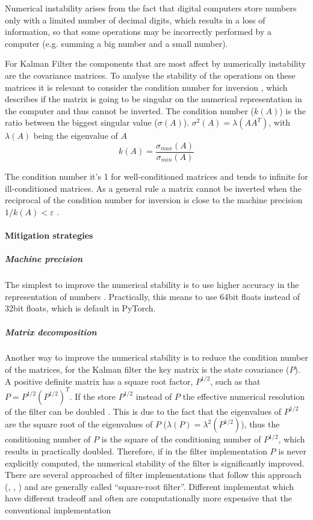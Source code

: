 \documentclass{article}
\begin{document}
Numerical instability arises from the fact that digital computers store numbers only with a limited number of decimal digits, which results in a loss of information, so that some operations may be incorrectly performed by a  computer (e.g. summing a big number and a small number).

For Kalman Filter the components that are most affect by numerically instability are the covariance matrices. To analyse the stability of the operations on these matrices it is relevant to consider the condition number for inversion \cite{mohinder_s_grewal_kalman_2001, kaminski_discrete_1971}, which describes if the matrix is going to be singular on the numerical representation in the computer and thus cannot be inverted. The condition number ($k(A)$) is the ratio between the biggest singular value ($\sigma(A)$). $\sigma^2(A) = \lambda(AA^T)$, with  $\lambda(A)$ being the eigenvalue of $A$
\begin{equation}\label{condition_number}
    k(A) = \frac{\sigma_{max}(A)}{\sigma_{min}(A)}
\end{equation}

The condition number it's 1 for well-conditioned matrices and tends to infinite for ill-conditioned matrices. As a general rule  a matrix cannot be inverted when the reciprocal of the condition number for inversion is close to the machine precision $ 1/k(A) < \varepsilon$ \cite{mohinder_s_grewal_kalman_2001}.

\paragraph{Mitigation strategies}

\subparagraph{Machine precision} The simplest to improve the numerical stability is to use higher accuracy in the representation of numbers \cite{dan_simon_optimal_2006}. Practically, this means to use 64bit floats instead of 32bit floats, which is default in PyTorch.

\subparagraph{Matrix decomposition} Another way to improve the numerical stability is to reduce the condition number of the matrices, for the Kalman filter the key matrix is the state covariance ($P$). A positive definite matrix has a square root factor, $P^{1/2}$, such as that $P = P^{1/2}(P^{1/2})^T$. If the store $P^{1/2}$ instead of $P$ the effective numerical resolution of the filter can be doubled \cite{kaminski_discrete_1971} \cite{dan_simon_optimal_2006} \cite{rutten_square-root_2013}. This is due to the fact that the eigenvalues of $P^{1/2}$ are the square root of the eigenvalues of $P$ ($\lambda(P) = \lambda^2(P^{1/2})$), thus the conditioning number of $P$ is the square of the conditioning number of $P^{1/2}$, which results in practically doubled. Therefore, if in the filter implementation $P$ is never explicitly computed, the numerical stability of the filter is significantly improved.
There are several approached of filter implementations that follow this approach (\cite{potter_statistical_1963}, \cite{carlson_fast_1973}, \cite{bierman_numerical_1977}) and are generally called ``square-root filter''. Different implementat which have different tradeoff and often are computationally more expensive that the conventional implementation 
\end{document}
